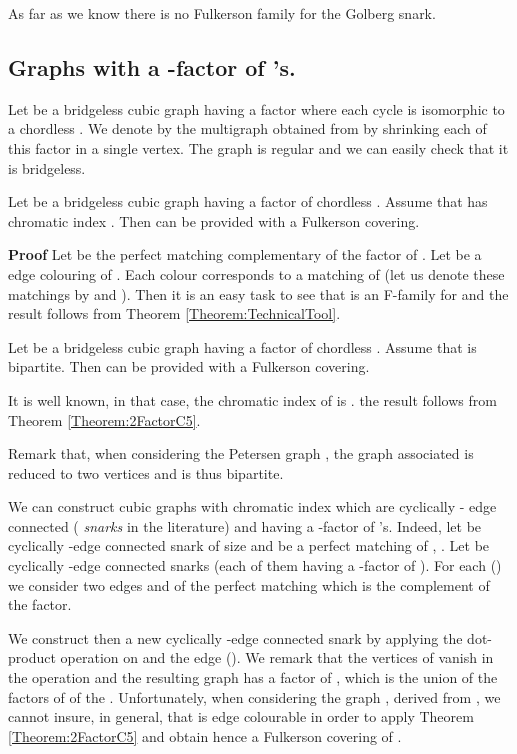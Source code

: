 \documentclass{amsart}
\theoremstyle{definition}
\theoremstyle{remark}
\newenvironment{prf}{{\bf \noindent Proof } }{\hfill\\}
\begin{document}
As far as we know there is no Fulkerson family for the Golberg snark.

\subsection{Graphs with a -factor of 's.}
Let  be a bridgeless cubic graph having a factor where each
cycle is isomorphic to a chordless . We denote by  the
multigraph obtained from  by shrinking each  of this
factor in a single vertex. The graph  is regular and
we can easily check that it is bridgeless.

\begin{thm} \label{Theorem:2FactorC5}  Let  be a bridgeless cubic graph
having a factor
of chordless . Assume that  
 has chromatic index . Then  can be provided with a Fulkerson covering.
\end{thm}
\begin{prf} Let  be the perfect matching complementary of the factor of
.
Let  be a edge colouring of . Each colour
corresponds to a matching of  (let us denote these matchings by
 and ). Then it is an easy task to see that  is an F-family for  and the result follows from
Theorem \ref{Theorem:TechnicalTool}.
\end{prf}

\begin{thm} \label{Cor:2FactorC5Biparti}  Let  be a bridgeless cubic graph
having a factor of
 chordless . Assume that  
 is bipartite. Then  can be provided with a Fulkerson covering.
\end{thm}
\begin{prf}
It is well known, in that case, the chromatic index of  is
. the result follows from Theorem \ref{Theorem:2FactorC5}.
\end{prf}

Remark that, when considering the Petersen graph  , the graph
associated  is reduced to two vertices and is thus bipartite.

We can construct  cubic graphs with chromatic index   which are cyclically - edge connected ({\em
snarks} in the literature)
and having a -factor of 's. Indeed, let  be cyclically
-edge connected snark of size  and  be a perfect matching
of , . Let  be 
 cyclically -edge connected snarks (each of them having a
-factor of ). For each  () we
consider two edges  and  of the perfect
matching which is the complement of the factor.

We construct then a new cyclically -edge connected snark   by
applying the dot-product operation on  and the edge  (). We remark that the vertices of  vanish in the
operation and the resulting graph  has a  factor of ,
 which is the union of the factors of  of the
. Unfortunately, when considering the graph , derived
from , we cannot insure, in general, that  is edge
colourable in order to apply Theorem \ref{Theorem:2FactorC5} and
obtain hence a Fulkerson covering of .
\end{document}
